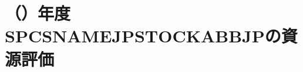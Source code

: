 \chapter{\thisyrjp（\thisyrad）年度SPCSNAMEJPSTOCKABBJPの資源評価}
%










\clearpage%
%
\setcounter{chapter}{0}
